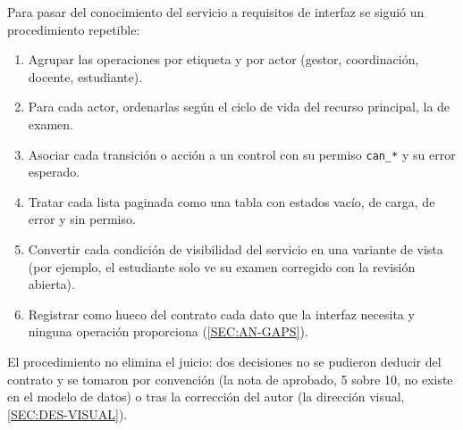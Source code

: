 Para pasar del conocimiento del servicio a requisitos de interfaz se siguió un procedimiento
repetible:
\begin{enumerate}
  \item Agrupar las operaciones por etiqueta y por actor (gestor, coordinación, docente,
        estudiante).
  \item Para cada actor, ordenarlas según el ciclo de vida del recurso principal, la
         de examen.
  \item Asociar cada transición o acción a un control con su permiso \texttt{can\_*} y su
        error esperado.
  \item Tratar cada lista paginada como una tabla con estados vacío, de carga, de error y
        sin permiso.
  \item Convertir cada condición de visibilidad del servicio en una variante de vista (por
        ejemplo, el estudiante solo ve su examen corregido con la revisión abierta).
  \item Registrar como hueco del contrato cada dato que la interfaz necesita y ninguna
        operación proporciona (\cref{SEC:AN-GAPS}).
\end{enumerate}
El procedimiento no elimina el juicio: dos decisiones no se pudieron deducir del contrato y
se tomaron por convención (la nota de aprobado, 5 sobre 10, no existe en el modelo de
datos) o tras la corrección del autor (la dirección visual, \cref{SEC:DES-VISUAL}).
